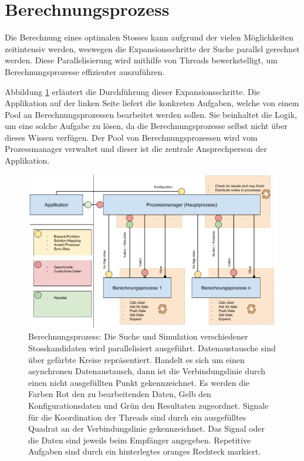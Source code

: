 \clearpage
\section{Berechnungsprozess}
Die Berechnung eines optimalen Stosses kann aufgrund der vielen Möglichkeiten zeitintensiv werden, weswegen
die Expansionsschritte der Suche parallel gerechnet werden.
Diese Parallelisierung wird mithilfe von Threads bewerkstelligt, um Berechnungsprozesse effizienter auszuführen.

Abbildung \ref{fig:berechnungsprozess} erläutert die Durchführung dieser Expansionsschritte.
Die Applikation auf der linken Seite liefert die konkreten Aufgaben, welche von einem Pool an Berechnungsprozessen
bearbeitet werden sollen. Sie beinhaltet die Logik, um eine solche Aufgabe zu lösen, da die Berechnungsprozesse
selbst nicht über dieses Wissen verfügen.
Der Pool von Berechnungsprozessen wird vom Prozessmanager verwaltet und dieser ist die zentrale Ansprechperson der Applikation.

\begin{figure}[h!]
    \begin{center}
        \includegraphics[width=0.8\linewidth]{../common/03_billiard_ai/resources/14_berechnungsprozess.png}
    \end{center}
    \caption{
        Berechnungsprozess: Die Suche und Simulation verschiedener Stosskandidaten wird parallelisiert ausgeführt.
        Datenaustausche sind über gefärbte Kreise repräsentiert. Handelt es sich um einen asynchronen
        Datenaustausch, dann ist die Verbindungslinie durch einen nicht ausgefüllten Punkt gekennzeichnet.
        Es werden die Farben Rot den zu bearbeitenden Daten,
        Gelb den Konfigurationsdaten und Grün den Resultaten zugeordnet.
        Signale für die Koordination der Threads sind durch ein ausgefülltes Quadrat an der Verbindungslinie gekennzeichnet.
        Das Signal oder die Daten sind jeweils beim Empfänger angegeben.
        Repetitive Aufgaben sind durch ein hinterlegtes oranges Rechteck markiert.
    }
    \label{fig:berechnungsprozess}
\end{figure}

